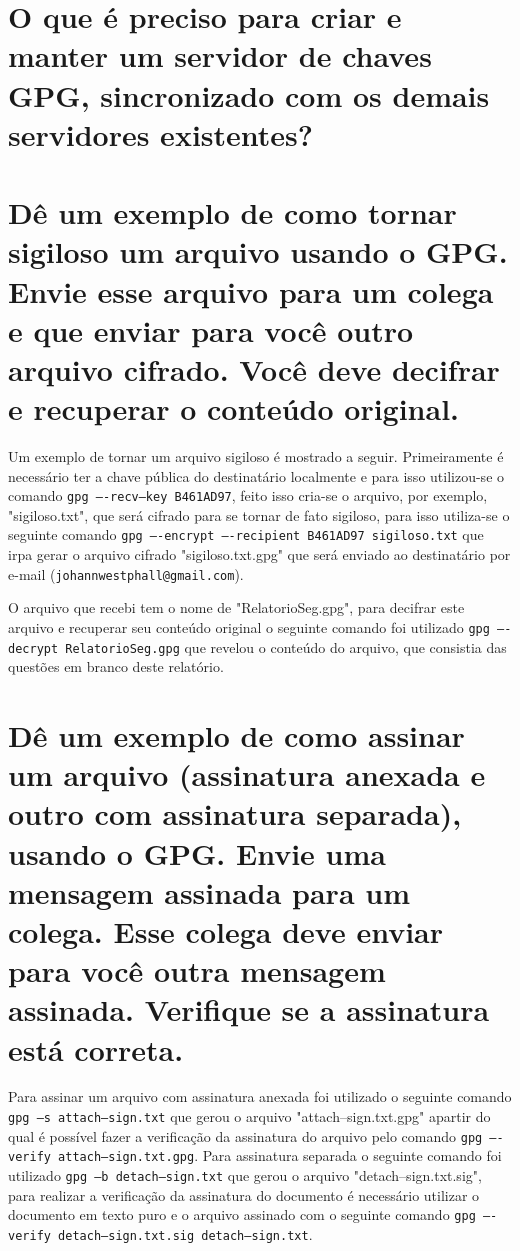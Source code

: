 \documentclass[
    article,            %
    11pt,               %
    oneside,            %
    a4paper,            %
    english,            %
    brazil,             %
    sumario=tradicional,
    ]{abntex2}
\begin{document}
\section{O que é preciso para criar e manter um servidor de chaves GPG, sincronizado com os demais servidores existentes?}


\section{Dê um exemplo de como tornar sigiloso um arquivo usando o GPG. Envie esse arquivo para um colega e que enviar para você outro arquivo cifrado. Você deve decifrar e recuperar o conteúdo original.}

Um exemplo de tornar um arquivo sigiloso é mostrado a seguir. Primeiramente é necessário ter a chave pública do destinatário localmente e para isso utilizou-se o comando  \texttt{gpg ----recv--key B461AD97}, feito isso cria-se o arquivo, por exemplo, "sigiloso.txt", que será cifrado para se tornar de fato sigiloso, para isso utiliza-se o seguinte comando \texttt{gpg ----encrypt ----recipient B461AD97 sigiloso.txt} que irpa gerar o arquivo cifrado "sigiloso.txt.gpg" que será enviado ao destinatário por e-mail (\texttt{johannwestphall@gmail.com}).

O arquivo que recebi tem o nome de "RelatorioSeg.gpg", para decifrar este arquivo e recuperar seu conteúdo original o seguinte comando foi utilizado \texttt{gpg ----decrypt RelatorioSeg.gpg} que revelou o conteúdo do arquivo, que consistia das questões em branco deste relatório. 

\section{Dê um exemplo de como assinar um arquivo (assinatura anexada e outro com assinatura separada), usando o GPG. Envie uma mensagem assinada para um colega. Esse colega deve enviar para você outra mensagem assinada. Verifique se a assinatura está correta.}

Para assinar um arquivo com assinatura anexada foi utilizado o seguinte comando \texttt{gpg --s attach--sign.txt} que gerou o arquivo "attach--sign.txt.gpg" apartir do qual é possível fazer a verificação da assinatura do arquivo pelo comando \texttt{gpg ----verify attach--sign.txt.gpg}. Para assinatura separada o seguinte comando foi utilizado \texttt{gpg --b detach--sign.txt} que gerou o arquivo "detach--sign.txt.sig", para realizar a verificação da assinatura do documento é necessário utilizar o documento em texto puro e o arquivo assinado com o seguinte comando \texttt{gpg ----verify detach--sign.txt.sig detach--sign.txt}.
\end{document}
